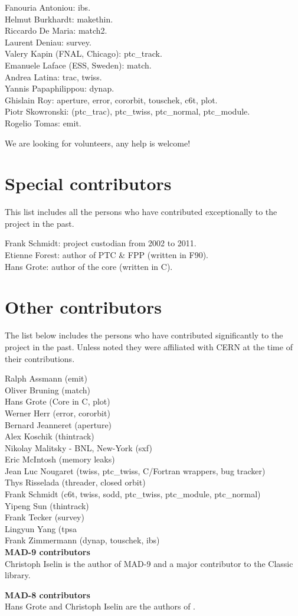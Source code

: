 Fanouria Antoniou: ibs.\\
Helmut Burkhardt: makethin.\\
Riccardo De Maria: match2.\\
Laurent Deniau: survey.\\
Valery Kapin (FNAL, Chicago): ptc\_track.\\
Emanuele Laface (ESS, Sweden): match.\\
Andrea Latina: trac, twiss.\\
Yannis Papaphilippou: dynap.\\
Ghislain Roy: aperture, error, cororbit, touschek, c6t, plot.\\
Piotr Skowronski: (ptc\_trac), ptc\_twiss, ptc\_normal, ptc\_module.\\
Rogelio Tomas: emit.

We are looking for volunteers, any help is welcome!


\section{Special contributors}

This list includes all the persons who have contributed exceptionally to the project in the past.

Frank Schmidt: project custodian from 2002 to 2011. \\
Etienne Forest: author of PTC \& FPP (written in F90). \\
Hans Grote: author of the core (written in C).


\section{Other contributors}

The list below includes the persons who have contributed significantly
to the \madx project in the past. Unless noted they were affiliated with
CERN at the time of their contributions. 

Ralph Assmann  (emit) \\
Oliver Bruning (match) \\
Hans Grote (Core in C, plot) \\
Werner Herr (error, cororbit) \\
Bernard Jeanneret (aperture) \\
Alex Koschik (thintrack) \\
Nikolay Malitsky - BNL, New-York  (sxf) \\
Eric McIntosh (memory leaks) \\
Jean Luc Nougaret (twiss, ptc\_twiss, C/Fortran wrappers, bug tracker) \\
Thys Risselada (threader, closed orbit) \\
Frank Schmidt (c6t, twiss, sodd, ptc\_twiss, ptc\_module, ptc\_normal) \\
Yipeng Sun (thintrack) \\
Frank Tecker (survey)\\
Lingyun Yang (tpsa \\
Frank Zimmermann (dynap, touschek, ibs) \\

{\bf MAD-9 contributors}\\
Christoph Iselin is the author of MAD-9 and a major contributor to the Classic library.

{\bf MAD-8 contributors}\\
Hans Grote and Christoph Iselin are the authors of \madeight.

\newpage

